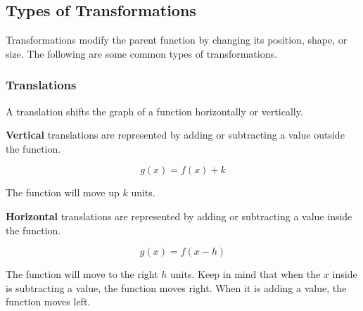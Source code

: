 \documentclass{article}
\begin{document}
\subsection{Types of Transformations}

Transformations modify the parent function by changing its position, shape, or size. The following are some common types of transformations.

\subsubsection{Translations}

A translation shifts the graph of a function horizontally or vertically. 

\textbf{Vertical} translations are represented by adding or subtracting a value outside the function.

\begin{equation*}
    g(x) = f(x) + k    
\end{equation*}

The function will move up $k$ units.

\begin{center}
\end{center}

\textbf{Horizontal} translations are represented by adding or subtracting a value inside the function.

\begin{equation*}
    g(x) = f(x - h)
\end{equation*}

The function will move to the right $h$ units. Keep in mind that when the $x$ inside is subtracting a value, the function moves right. When it is adding a value, the function moves left.

\begin{center}
\end{center}
\end{document}
